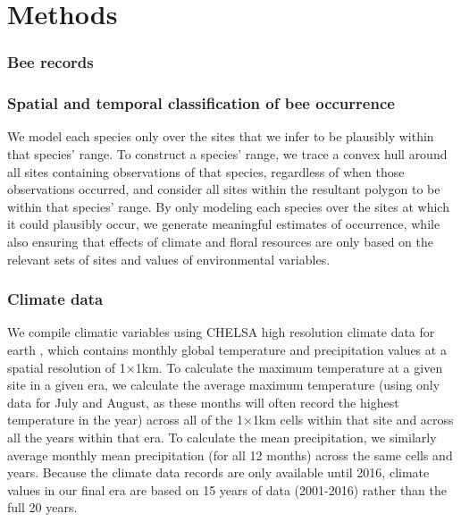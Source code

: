\documentclass[12pt]{article}
\begin{document}
\section{Methods}

\subsubsection{Bee records}

\subsubsection{Spatial and temporal classification of bee occurrence}

We model each species only over the sites that we infer to be plausibly within that species' range. To construct a species' range, we trace a convex hull around all sites containing observations of that species, regardless of when those observations occurred, and consider all sites within the resultant polygon to be within that species' range. By only modeling each species over the sites at which it could plausibly occur, we generate meaningful estimates of occurrence, while also ensuring that effects of climate and floral resources are only based on the relevant sets of sites and values of environmental variables. 

\subsubsection{Climate data}
We compile climatic variables using CHELSA high resolution climate data for earth \citep{karger2017climatologies, karger2018chelsacruts}, which contains monthly global temperature and precipitation values at a spatial resolution of 1$\times$1km. To calculate the maximum temperature at a given site in a given era, we calculate the average maximum temperature (using only data for July and August, as these months will often record the highest temperature in the year) across all of the 1$\times$1km cells within that site and across all the years within that era. To calculate the mean precipitation, we similarly average monthly mean precipitation (for all 12 months) across the same cells and years. Because the climate data records are only available until 2016, climate values in our final era are based on 15 years of data (2001-2016) rather than the full 20 years.
\end{document}
